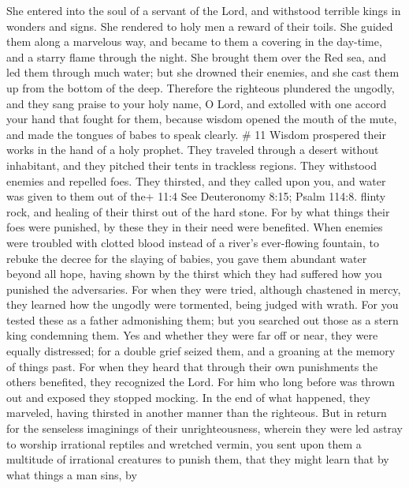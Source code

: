 She entered into the soul of a servant of the Lord, and withstood
terrible kings in wonders and signs.  She rendered to holy
men a reward of their toils. She guided them along a marvelous way, and
became to them a covering in the day-time, and a starry flame through
the night.  She brought them over the Red sea, and led them
through much water;  but she drowned their enemies, and she
cast them up from the bottom of the deep.  Therefore the
righteous plundered the ungodly, and they sang praise to your holy name,
O Lord, and extolled with one accord your hand that fought for them,
 because wisdom opened the mouth of the mute, and made the
tongues of babes to speak clearly. \# 11  Wisdom prospered
their works in the hand of a holy prophet.  They traveled
through a desert without inhabitant, and they pitched their tents in
trackless regions.  They withstood enemies and repelled
foes.  They thirsted, and they called upon you, and water
was given to them out of the+ 11:4 See Deuteronomy 8:15; Psalm 114:8.
flinty rock, and healing of their thirst out of the hard stone.
 For by what things their foes were punished, by these they
in their need were benefited.  When enemies were troubled
with clotted blood instead of a river's ever-flowing fountain,
 to rebuke the decree for the slaying of babies, you gave
them abundant water beyond all hope,  having shown by the
thirst which they had suffered how you punished the adversaries.
 For when they were tried, although chastened in mercy, they
learned how the ungodly were tormented, being judged with wrath.
 For you tested these as a father admonishing them; but you
searched out those as a stern king condemning them.  Yes
and whether they were far off or near, they were equally distressed;
 for a double grief seized them, and a groaning at the
memory of things past.  For when they heard that through
their own punishments the others benefited, they recognized the Lord.
 For him who long before was thrown out and exposed they
stopped mocking. In the end of what happened, they marveled, having
thirsted in another manner than the righteous.  But in
return for the senseless imaginings of their unrighteousness, wherein
they were led astray to worship irrational reptiles and wretched vermin,
you sent upon them a multitude of irrational creatures to punish them,
 that they might learn that by what things a man sins, by
